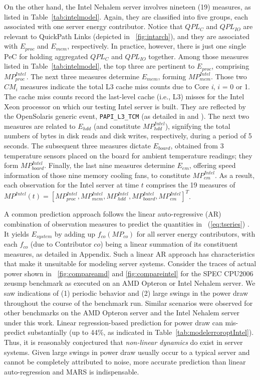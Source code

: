 On the other hand, the Intel Nehalem server involves nineteen (19) measures, as
listed in Table~\ref{tab:intelmodel}.  Again, they are classified into five
groups, each associated with one server energy contributor.
Notice that $QPL_{C}$ and $QPL_{IO}$ are relevant to QuickPath Links
(depicted in \figurename~\ref{fig:intarch}),
and they are associated with $E_{proc}$ and $E_{mem}$, respectively.
In practice, however, there is just one single PeC for holding aggregated
$QPL_{C}$ and $QPL_{IO}$ together.
Among those measures listed in Table~\ref{tab:intelmodel},
the top three are pertinent to $E_{proc}$, comprising $MP_{proc}^{Intel}$.
The next three measures determine $E_{mem}$, forming $MP_{mem}^{Intel}$.
Those two $CM_{i}$ measures indicate the total L3 cache miss counts
due to Core \textit{i}, $i$ = 0 or 1.
The cache miss counts record the last-level cache (i.e., L3) misses
for the Intel Xeon processor on which our testing Intel
server is built.  They are reflected by the OpenSolaris generic event,
\texttt{PAPI\_L3\_TCM} (as detailed in \cite{Sun2008b} and \cite{Intel2009}).
The next two measures are related to $E_{hdd}$ (and constitute $MP_{hdd}^{Intel}$),
signifying the total numbers of bytes in disk reads and disk writes,
respectively, during a period of 5 seconds.
The subsequent three measures dictate $E_{board}$, obtained
from 3 temperature sensors placed on the board for ambient temperature readings;
they form $MP_{board}^{Intel}$.
Finally, the last nine measures determine $E_{em}$, offering speed
information of those nine memory cooling fans, to constitute $MP_{em}^{Intel}$.
As a result, each observation for the Intel server at time $t$ comprises the 19 measures of
$MP^{Intel}(t) =\left[MP_{proc}^{Intel}, MP_{mem}^{Intel}, MP_{hdd}^{Intel}, MP_{board}^{Intel}, MP_{em}^{Intel}\right]^{T}$.

A common prediction approach follows the linear auto-regressive (AR)
combination of observation measures to predict the quantities in
\equationname~(\ref{eq:tseries})  \cite{Lewis2008}.
It yields $E_{system}$ by adding up $f_{co}(MP_{co})$ for all server energy
contributors, with each $f_{co}$ (due to Contributor $co$) being a
linear summation of its constituent measures, as detailed in Appendix.
Such a linear AR approach has characteristics that make it unsuitable
for modeling server systems.  Consider the traces of actual power shown
in \figurenames~\ref{fig:compareamd} and \ref{fig:compareintel} for the
SPEC CPU2006 zeusmp benchmark as executed on an AMD Opteron or Intel
Nehalem server.  We saw indications of (1) periodic behavior and (2)
large swings in the power draw throughout the course of the benchmark run.
Similar scenarios were observed for other benchmarks on 
the AMD Opteron server and the Intel Nehalem server under this work.
Linear regression-based prediction for power draw can
mis-predict substantially (up to 44\%, as indicated in
Table~\ref{tab:modelerroroptIntel}).  Thus, it is reasonably conjectured
that \textit{non-linear dynamics} do exist in server systems.  Given
large swings in power draw usually occur to a typical server and cannot
be completely attributed to noise, more accurate prediction than linear
auto-regression and MARS \cite{Friedman1991} is indispensable.
